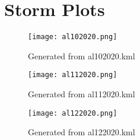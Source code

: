 \documentclass[]{article}
\begin{document}
\section{Storm Plots}
\begin{figure}[ht]
    \centering
    \texttt{[image: al102020.png]}
    \caption{Generated from al102020.kml}
\end{figure}
\begin{figure}[ht]
    \centering
    \texttt{[image: al112020.png]}
    \caption{Generated from al112020.kml}
\end{figure}
\begin{figure}[ht]
    \centering
    \texttt{[image: al122020.png]}
    \caption{Generated from al122020.kml}
\end{figure}
\end{document}
